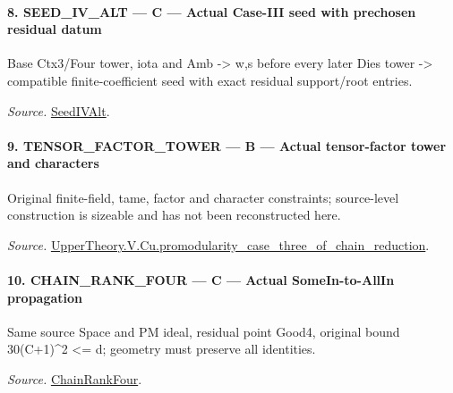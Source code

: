 \paragraph{8. SEED\_\allowbreak IV\_\allowbreak ALT — C — Actual Case-III seed with prechosen residual datum}

Base Ctx3/Four tower, iota and Amb -> w,s before every later Dies tower -> compatible finite-coefficient seed with exact residual support/root entries.

\emph{Source.} \href{https://github.com/CocoSgt/riemann-hypothesis-lean/blob/7cbf7a0c32fca1badf05931879a37c3f8a2b03b4/src/Development/AutomorphicArithmetic/AutomorphicVarieties/ModularityArgument/ThresholdArguments/DenseThresholdCases/PromodularityCaseThree.lean#L19-L25}{SeedIVAlt}.



\paragraph{9. TENSOR\_\allowbreak FACTOR\_\allowbreak TOWER — B — Actual tensor-factor tower and characters}

Original finite-field, tame, factor and character constraints; source-level construction is sizeable and has not been reconstructed here.

\emph{Source.} \href{https://github.com/CocoSgt/riemann-hypothesis-lean/blob/7cbf7a0c32fca1badf05931879a37c3f8a2b03b4/src/Development/AutomorphicArithmetic/AutomorphicVarieties/ModularityArgument/ThresholdArguments/DenseThresholdCases/PromodularityCaseThreeOfLemmas.lean#L131-L153}{UpperTheory.V.Cu.promodularity\_\allowbreak case\_\allowbreak three\_\allowbreak of\_\allowbreak chain\_\allowbreak reduction}.



\paragraph{10. CHAIN\_\allowbreak RANK\_\allowbreak FOUR — C — Actual SomeIn-to-AllIn propagation}

Same source Space and PM ideal, residual point Good4, original bound 30(C+1)\textasciicircum{}2 <= d; geometry must preserve all identities.

\emph{Source.} \href{https://github.com/CocoSgt/riemann-hypothesis-lean/blob/7cbf7a0c32fca1badf05931879a37c3f8a2b03b4/src/Development/AutomorphicArithmetic/AutomorphicVarieties/ModularityArgument/ThresholdArguments/DenseThresholdCases/PromodularityCaseThree.lean#L26-L32}{ChainRankFour}.



